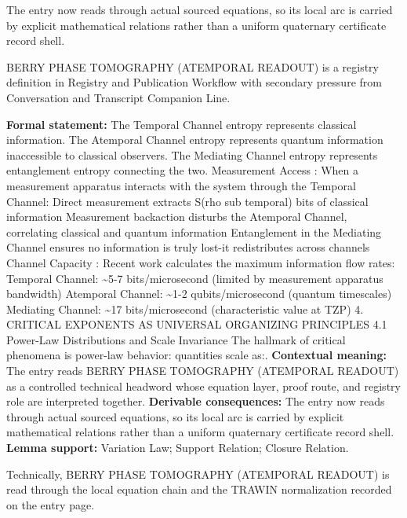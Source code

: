 The entry now reads through actual sourced equations, so its local arc is carried by explicit mathematical relations rather than a uniform quaternary certificate record shell.
\clearpage


\begingroup\small
{}
BERRY PHASE TOMOGRAPHY (ATEMPORAL READOUT) is a registry definition in Registry and Publication Workflow with secondary pressure from Conversation and Transcript Companion Line.

\begingroup\footnotesize\setlength{\emergencystretch}{3em}\sloppy
\textbf{Formal statement:} The Temporal Channel entropy represents classical information. The Atemporal Channel entropy represents quantum information inaccessible to classical observers. The Mediating Channel entropy represents entanglement entropy connecting the two. Measurement Access : When a measurement apparatus interacts with the system through the Temporal Channel: Direct measurement extracts S(rho sub temporal) bits of classical information Measurement backaction disturbs the Atemporal Channel, correlating classical and quantum information Entanglement in the Mediating Channel ensures no information is truly lost-it redistributes across channels Channel Capacity : Recent work calculates the maximum information flow rates: Temporal Channel: \textasciitilde{}5-7 bits/microsecond (limited by measurement apparatus bandwidth) Atemporal Channel: \textasciitilde{}1-2 qubits/microsecond (quantum timescales) Mediating Channel: \textasciitilde{}17 bits/microsecond (characteristic value at TZP) 4. CRITICAL EXPONENTS AS UNIVERSAL ORGANIZING PRINCIPLES 4.1 Power-Law Distributions and Scale Invariance The hallmark of critical phenomena is power-law behavior: quantities scale as:. \textbf{Contextual meaning:} The entry reads BERRY PHASE TOMOGRAPHY (ATEMPORAL READOUT) as a controlled technical headword whose equation layer, proof route, and registry role are interpreted together. \textbf{Derivable consequences:} The entry now reads through actual sourced equations, so its local arc is carried by explicit mathematical relations rather than a uniform quaternary certificate record shell. \textbf{Lemma support:} Variation Law; Support Relation; Closure Relation.\par
\endgroup

Technically, BERRY PHASE TOMOGRAPHY (ATEMPORAL READOUT) is read through the local equation chain and the TRAWIN normalization recorded on the entry page.

